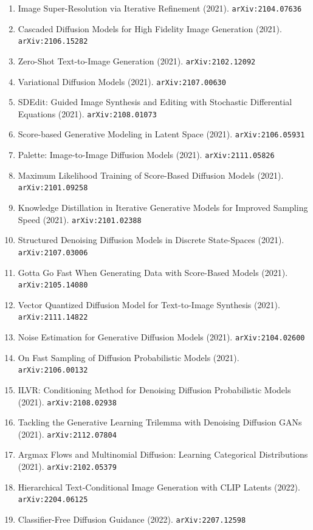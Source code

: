 \documentclass[11pt]{article}
\begin{document}
\begin{enumerate}
  Text-Guided Diffusion Models (2021). \texttt{arXiv:2112.10741}
  \item Image Super-Resolution via Iterative Refinement (2021). \texttt{arXiv:2104.07636}
  \item Cascaded Diffusion Models for High Fidelity Image Generation (2021). \texttt{arXiv:2106.15282}
  \item Zero-Shot Text-to-Image Generation (2021). \texttt{arXiv:2102.12092}
  \item Variational Diffusion Models (2021). \texttt{arXiv:2107.00630}
  \item SDEdit: Guided Image Synthesis and Editing with Stochastic Differential
  Equations (2021). \texttt{arXiv:2108.01073}
  \item Score-based Generative Modeling in Latent Space (2021). \texttt{arXiv:2106.05931}
  \item Palette: Image-to-Image Diffusion Models (2021). \texttt{arXiv:2111.05826}
  \item Maximum Likelihood Training of Score-Based Diffusion Models (2021). \texttt{arXiv:2101.09258}
  \item Knowledge Distillation in Iterative Generative Models for Improved
  Sampling Speed (2021). \texttt{arXiv:2101.02388}
  \item Structured Denoising Diffusion Models in Discrete State-Spaces (2021). \texttt{arXiv:2107.03006}
  \item Gotta Go Fast When Generating Data with Score-Based Models (2021). \texttt{arXiv:2105.14080}
  \item Vector Quantized Diffusion Model for Text-to-Image Synthesis (2021). \texttt{arXiv:2111.14822}
  \item Noise Estimation for Generative Diffusion Models (2021). \texttt{arXiv:2104.02600}
  \item On Fast Sampling of Diffusion Probabilistic Models (2021). \texttt{arXiv:2106.00132}
  \item ILVR: Conditioning Method for Denoising Diffusion Probabilistic Models (2021). \texttt{arXiv:2108.02938}
  \item Tackling the Generative Learning Trilemma with Denoising Diffusion GANs (2021). \texttt{arXiv:2112.07804}
  \item Argmax Flows and Multinomial Diffusion: Learning Categorical
  Distributions (2021). \texttt{arXiv:2102.05379}
  \item Hierarchical Text-Conditional Image Generation with CLIP Latents (2022). \texttt{arXiv:2204.06125}
  \item Classifier-Free Diffusion Guidance (2022). \texttt{arXiv:2207.12598}

\end{enumerate}
\end{document}
